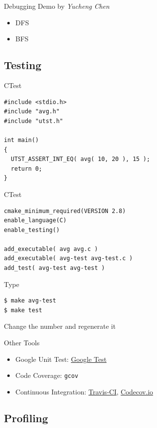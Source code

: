 \documentclass{../TexTemplate/myslide}
\begin{document}
\begin{frame}{Debugging}
Demo by \emph{Yucheng Chen}
\begin{itemize}
	\item DFS
	\item BFS
\end{itemize}
\end{frame}

\subsection{Testing}
\begin{frame}
\subsectionpage
\end{frame}

\begin{frame}[fragile]{CTest}
\begin{lstlisting}
#include <stdio.h>
#include "avg.h"
#include "utst.h"

int main()
{
  UTST_ASSERT_INT_EQ( avg( 10, 20 ), 15 );
  return 0;
}
\end{lstlisting}
\end{frame}

\begin{frame}[fragile]{CTest}
\begin{verbatim}
cmake_minimum_required(VERSION 2.8)
enable_language(C)
enable_testing()

add_executable( avg avg.c )
add_executable( avg-test avg-test.c )
add_test( avg-test avg-test )
\end{verbatim}
Type
\begin{verbatim}
$ make avg-test
$ make test
\end{verbatim}
Change the number and regenerate it
\end{frame}

\begin{frame}[fragile]{Other Tools}
\begin{itemize}
	\item Google Unit Test: \href{https://github.com/google/googletest}{Google Test}
	\item Code Coverage: \verb'gcov'
	\item Continuous Integration: \href{https://travis-ci.org/profile}{Travis-CI}, \href{https://codecov.io/}{Codecov.io}
\end{itemize}
\end{frame}

\subsection{Profiling}
\begin{frame}
\subsectionpage
\end{frame}
\end{document}

